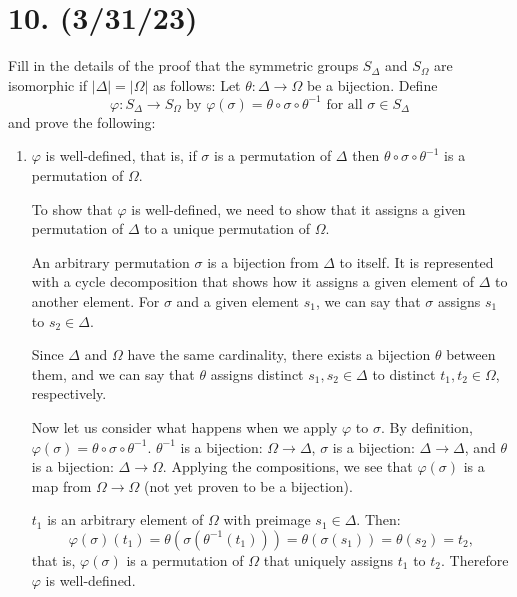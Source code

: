 \documentclass{article}
\begin{document}
\section*{10. (3/31/23)}

Fill in the details of the proof that the symmetric groups $S_\Delta$ and $S_\Omega$ are isomorphic if $|\Delta| = |\Omega|$ as follows: Let $\theta: \Delta \rightarrow \Omega$ be a bijection. Define
\begin{equation*}
    \varphi: S_\Delta \rightarrow S_\Omega \text{ by } \varphi(\sigma) = \theta \circ \sigma \circ \theta^{-1} \text{ for all } \sigma \in S_\Delta
\end{equation*}
and prove the following:

\begin{enumerate}[label=(\alph*)]
    \item $\varphi$ is well-defined, that is, if $\sigma$ is a permutation of $\Delta$ then $\theta \circ \sigma \circ \theta^{-1}$ is a permutation of $\Omega$.

        To show that $\varphi$ is well-defined, we need to show that it assigns a given permutation of $\Delta$ to a unique permutation of $\Omega$.

        An arbitrary permutation $\sigma$ is a bijection from $\Delta$ to itself. It is represented with a cycle decomposition that shows how it assigns a given element of $\Delta$ to another element. For $\sigma$ and a given element $s_1$, we can say that $\sigma$ assigns $s_1$ to $s_2 \in \Delta$.
        
        Since $\Delta$ and $\Omega$ have the same cardinality, there exists a bijection $\theta$ between them, and we can say that $\theta$ assigns distinct $s_1, s_2 \in \Delta$ to distinct $t_1, t_2 \in \Omega$, respectively.

        Now let us consider what happens when we apply $\varphi$ to $\sigma$. By definition, $\varphi(\sigma) = \theta \circ \sigma \circ \theta^{-1}$. $\theta^{-1}$ is a bijection: $\Omega \rightarrow \Delta$, $\sigma$ is a bijection: $\Delta \rightarrow \Delta$, and $\theta$ is a bijection: $\Delta \rightarrow \Omega$. Applying the compositions, we see that $\varphi(\sigma)$ is a map from $\Omega \rightarrow \Omega$ (not yet proven to be a bijection).
        
        $t_1$ is an arbitrary element of $\Omega$ with preimage $s_1 \in \Delta$. Then:
        \begin{equation*}
            \varphi(\sigma)(t_1) = \theta (\sigma (\theta^{-1}(t_1))) = \theta (\sigma(s_1)) = \theta(s_2) = t_2,
        \end{equation*}
        that is, $\varphi(\sigma)$ is a permutation of $\Omega$ that uniquely assigns $t_1$ to $t_2$. Therefore $\varphi$ is well-defined.
    

\end{enumerate}
\end{document}
